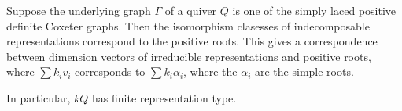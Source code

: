 Suppose the underlying graph $\Gamma$ of a quiver $Q$ is one of the simply laced
positive definite Coxeter graphs. Then the isomorphism clasesses of
indecomposable representations correspond to the positive roots. This gives
a correspondence between dimension vectors of irreducible representations and
positive roots, where $\sum k_iv_i$ corresponds to $\sum k_i\alpha_i$, where
the $\alpha_i$ are the simple roots.

In particular, $kQ$ has finite representation type.
